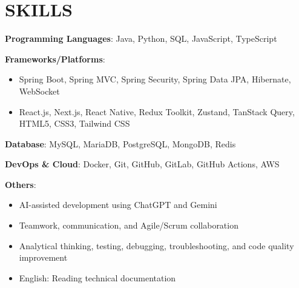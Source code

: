 \section{SKILLS}
\resumeSubHeadingListStart

  \item
    \resumeItemListStart
      \item \textbf{Programming Languages}: Java, Python, SQL, JavaScript, TypeScript
      \item \textbf{Frameworks/Platforms}:
        \begin{itemize}
          \item Spring Boot, Spring MVC, Spring Security, Spring Data JPA, Hibernate, WebSocket
          \item React.js, Next.js, React Native, Redux Toolkit, Zustand, TanStack Query, HTML5, CSS3, Tailwind CSS
        \end{itemize}
      \item \textbf{Database}: MySQL, MariaDB, PostgreSQL, MongoDB, Redis
      \item \textbf{DevOps \& Cloud}: Docker, Git, GitHub, GitLab, GitHub Actions, AWS
      \item \textbf{Others}:
        \begin{itemize}
          \item AI-assisted development using ChatGPT and Gemini
          \item Teamwork, communication, and Agile/Scrum collaboration
          \item Analytical thinking, testing, debugging, troubleshooting, and code quality improvement
          \item English: Reading technical documentation
        \end{itemize}
    \resumeItemListEnd

\resumeSubHeadingListEnd
